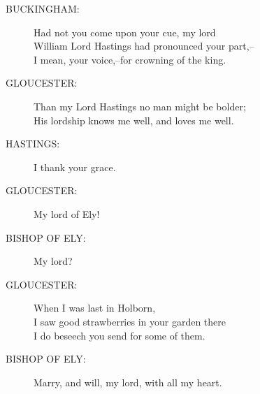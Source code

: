 \documentclass{article}
\begin{document}
\begin{description}
\item[BUCKINGHAM:] 
\hspace{1pt}Had not you come upon your cue, my lord\\
\hspace{1pt}William Lord Hastings had pronounced your part,--\\
\hspace{1pt}I mean, your voice,--for crowning of the king.\\
\end{description}
\begin{description}
\item[GLOUCESTER:] 
\hspace{1pt}Than my Lord Hastings no man might be bolder;\\
\hspace{1pt}His lordship knows me well, and loves me well.\\
\end{description}
\begin{description}
\item[HASTINGS:] 
\hspace{1pt}I thank your grace.\\
\end{description}
\begin{description}
\item[GLOUCESTER:] 
\hspace{1pt}My lord of Ely!\\
\end{description}
\begin{description}
\item[BISHOP OF ELY:] 
\hspace{1pt}My lord?\\
\end{description}
\begin{description}
\item[GLOUCESTER:] 
\hspace{1pt}When I was last in Holborn,\\
\hspace{1pt}I saw good strawberries in your garden there\\
\hspace{1pt}I do beseech you send for some of them.\\
\end{description}
\begin{description}
\item[BISHOP OF ELY:] 
\hspace{1pt}Marry, and will, my lord, with all my heart.\\
\end{description}
\end{document}

